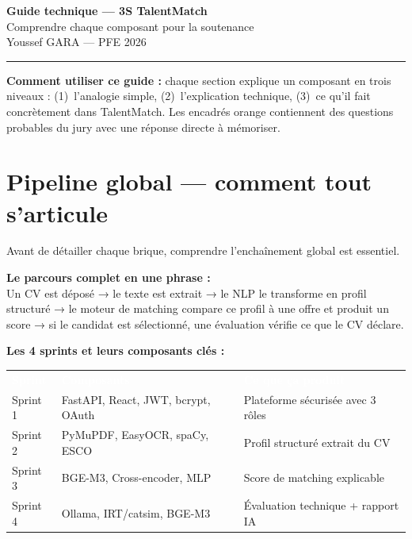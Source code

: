 \documentclass[12pt,a4paper]{article}
\newenvironment{boite}{%
  \def\FrameCommand{\fboxsep=8pt\colorbox{bleulight}}%
  \MakeFramed{\advance\hsize-\width \FrameRestore}%
  \vspace{-4pt}%
}{\endMakeFramed}
\begin{document}

\begin{center}
{\LARGE\bfseries\color{bleu} Guide technique — 3S TalentMatch}\\[6pt]
{\large Comprendre chaque composant pour la soutenance}\\[4pt]
{\normalsize Youssef GARA — PFE 2026}
\end{center}
\vspace{4pt}
\hrule
\vspace{12pt}

\textbf{Comment utiliser ce guide :} chaque section explique un composant en trois niveaux : (1)~l'analogie simple, (2)~l'explication technique, (3)~ce qu'il fait concrètement dans TalentMatch. Les encadrés orange contiennent des questions probables du jury avec une réponse directe à mémoriser.

\tableofcontents
\newpage

\section{Pipeline global — comment tout s'articule}

Avant de détailler chaque brique, comprendre l'enchaînement global est essentiel.

\begin{boite}
\textbf{Le parcours complet en une phrase :}\\
Un CV est déposé → le texte est extrait → le NLP le transforme en profil structuré → le moteur de matching compare ce profil à une offre et produit un score → si le candidat est sélectionné, une évaluation vérifie ce que le CV déclare.
\end{boite}

\medskip

\textbf{Les 4 sprints et leurs composants clés :}

\begin{tabularx}{\textwidth}{p{2.5cm} p{4cm} X}
\rowcolor{bleu}
\textcolor{white}{\textbf{Sprint}} & \textcolor{white}{\textbf{Composants}} & \textcolor{white}{\textbf{Ce que ça produit}} \\
Sprint 1 & FastAPI, React, JWT, bcrypt, OAuth & Plateforme sécurisée avec 3 rôles \\
\rowcolor{bleulight}
Sprint 2 & PyMuPDF, EasyOCR, spaCy, ESCO & Profil structuré extrait du CV \\
Sprint 3 & BGE-M3, Cross-encoder, MLP & Score de matching explicable \\
\rowcolor{bleulight}
Sprint 4 & Ollama, IRT/catsim, BGE-M3 & Évaluation technique + rapport IA \\
\bottomrule
\end{tabularx}
\end{document}
